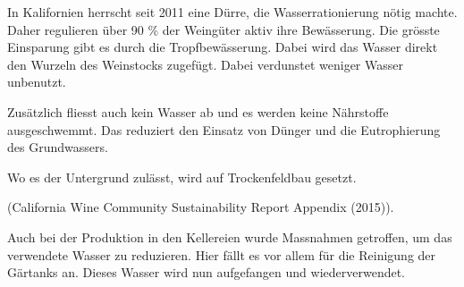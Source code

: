 In Kalifornien
herrscht seit 2011 eine Dürre, die Wasserrationierung nötig machte. Daher regulieren über 90 \% der
Weingüter aktiv ihre Bewässerung. Die grösste Einsparung gibt es durch die Tropfbewässerung. Dabei
wird das Wasser direkt den Wurzeln  des Weinstocks zugefügt. Dabei verdunstet weniger Wasser
unbenutzt.

Zusätzlich fliesst auch kein Wasser ab und es werden keine Nährstoffe ausgeschwemmt. Das reduziert
den Einsatz von Dünger und die Eutrophierung des Grundwassers.

Wo es der Untergrund zulässt, wird auf Trockenfeldbau gesetzt.

(\glqq{}California Wine Community Sustainability Report Appendix\grqq{} (2015)).


Auch bei der Produktion in den Kellereien wurde Massnahmen getroffen, um das verwendete Wasser zu
reduzieren. Hier fällt es vor allem für die Reinigung der Gärtanks an. Dieses Wasser wird nun
aufgefangen und wiederverwendet.
